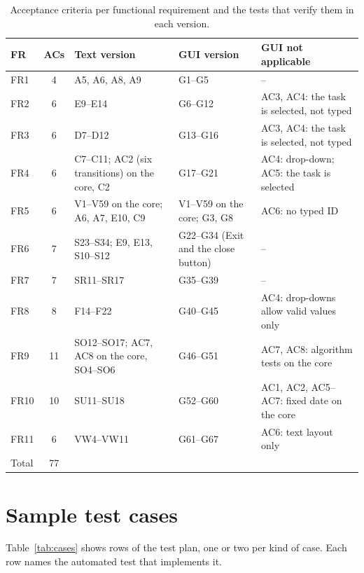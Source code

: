 \documentclass[11pt,a4paper]{article}
\begin{document}
\begin{table}[ht]
\centering
\footnotesize
\begin{tabularx}{\textwidth}{@{}lcXXX@{}}
\toprule
FR & ACs & Text version & GUI version & GUI not applicable \\
\midrule
FR1 & 4 & A5, A6, A8, A9 & G1--G5 & -- \\
FR2 & 6 & E9--E14 & G6--G12 & AC3, AC4: the task is selected, not typed \\
FR3 & 6 & D7--D12 & G13--G16 & AC3, AC4: the task is selected, not typed \\
FR4 & 6 & C7--C11; AC2 (six transitions) on the core, C2 & G17--G21 & AC4: drop-down; AC5: the task is selected \\
FR5 & 6 & V1--V59 on the core; A6, A7, E10, C9 & V1--V59 on the core; G3, G8 & AC6: no typed ID \\
FR6 & 7 & S23--S34; E9, E13, S10--S12 & G22--G34 (Exit and the close button) & -- \\
FR7 & 7 & SR11--SR17 & G35--G39 & -- \\
FR8 & 8 & F14--F22 & G40--G45 & AC4: drop-downs allow valid values only \\
FR9 & 11 & SO12--SO17; AC7, AC8 on the core, SO4--SO6 & G46--G51 & AC7, AC8: algorithm tests on the core \\
FR10 & 10 & SU11--SU18 & G52--G60 & AC1, AC2, AC5--AC7: fixed date on the core \\
FR11 & 6 & VW4--VW11 & G61--G67 & AC6: text layout only \\
\midrule
Total & 77 & & & \\
\bottomrule
\end{tabularx}
\caption{Acceptance criteria per functional requirement and the tests that
verify them in each version.}
\label{tab:trace}
\end{table}

\section{Sample test cases}
\label{app:cases}

Table~\ref{tab:cases} shows rows of the test plan, one or two per kind of
case. Each row names the automated test that implements it.
\end{document}
